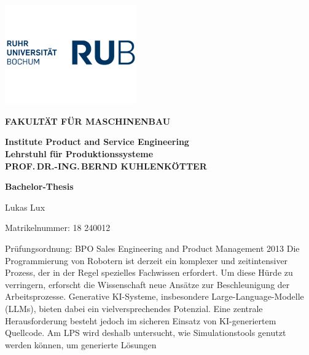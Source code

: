 \begin{titlepage}
  \rubflama %
  \thispagestyle{empty}
   
  \begin{minipage}{0.5\textwidth}%
    \includegraphics[width=56.9mm]{Figures/RUB-Logo-blau.png}
  \end{minipage}%
  \hfill%
  \begin{minipage}{0.5\textwidth}\raggedleft
    {\fontsize{9}{12}\selectfont \textcolor{rubgreen}{\bfseries FAKULTÄT FÜR
    MASCHINENBAU}}\par
    {\fontsize{8}{12}\selectfont \bfseries
      Institute Product and Service Engineering\\
      Lehrstuhl für Produktionssysteme\\
    PROF.\,DR.-ING.\,BERND KUHLENKÖTTER}%
  \end{minipage}
  \begin{center}
    {\bfseries \fontsize{16}{12}\selectfont Bachelor-Thesis}\par
    {Lukas Lux}
  \end{center}
  \fontsize{10}{12}\selectfont Matrikelnummer:  18 240012\par
  Prüfungsordnung: \quad BPO Sales Engineering and Product
  Management 2013
  \bigbreak
  \fontsize{12}{12}\selectfont{\bfseries Thema: \quad Entwicklung
    eines Frameworks zur simulationsbasierten Validierung
  LLM-generierten Robotercodes in Unity}
  \bigbreak
  \fontsize{10}{12}\selectfont Die Programmierung von Robotern ist derzeit ein
  komplexer und  zeitintensiver Prozess, der in der Regel spezielles Fachwissen
  erfordert. Um diese Hürde zu verringern, erforscht die Wissenschaft
  neue Ansätze zur Beschleunigung der Arbeitsprozesse. Generative
  KI-Systeme, insbesondere Large-Language-Modelle (LLMs), bieten
  dabei ein vielversprechendes Potenzial.
  Eine zentrale Herausforderung besteht jedoch im sicheren Einsatz
  von KI-generiertem Quellcode. Am LPS wird deshalb untersucht, wie
  Simulationstools genutzt werden können, um generierte Lösungen

\end{titlepage}
